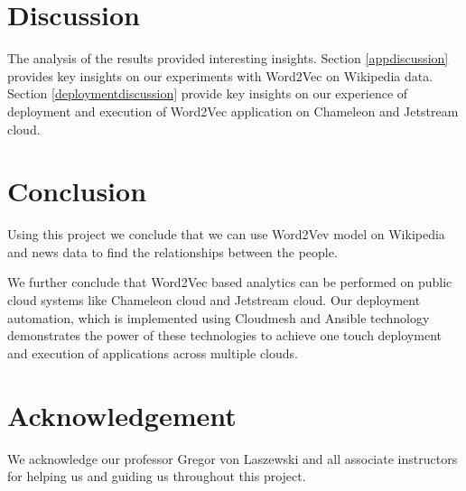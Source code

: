 \documentclass[9pt,twocolumn,twoside]{../../styles/osajnl}
\begin{document}
\section{Discussion}
The analysis of the results provided interesting insights.
Section \ref{appdiscussion} provides key insights on our experiments with
Word2Vec on Wikipedia data. Section \ref{deploymentdiscussion} provide key
insights on our experience of deployment and execution of Word2Vec
application on Chameleon and Jetstream cloud.
 \label{appdiscussion}
 \label{deploymentdiscussion}

\section{Conclusion}

Using this project we conclude that we can use Word2Vev model on Wikipedia
and news data to find the relationships between the people.

We further conclude that Word2Vec based analytics can be performed on public
cloud systems like Chameleon cloud and Jetstream cloud. Our deployment
automation, which is implemented using Cloudmesh and Ansible technology
demonstrates the power of these technologies to achieve one touch deployment
and execution of applications across multiple clouds.

\section{Acknowledgement}

We acknowledge our professor Gregor von Laszewski and all associate instructors for helping us and guiding us throughout this project.
\end{document}
